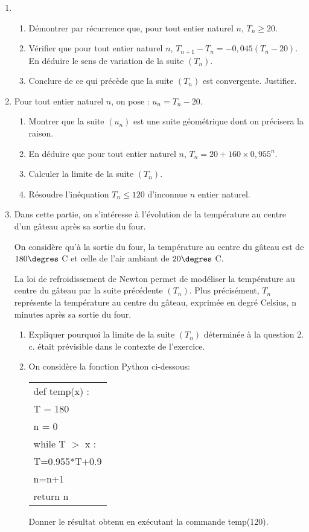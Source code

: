 \documentclass[10pt,a4paper]{article}
\begin{document}
\begin{enumerate}
\item 
	\begin{enumerate}
		\item Démontrer par récurrence que, pour tout entier naturel $n$,\: $T_n \geqslant 20$.
		\item Vérifier que pour tout entier naturel $n$,\: $T_{n+1} -  T_n  = - 0,045\left(T_n - 20\right)$. En déduire le sens de variation de la suite $\left(T_n\right)$.
		\item Conclure de ce qui précède que la suite $\left(T_n\right)$ est convergente. Justifier.
	\end{enumerate}	
\item Pour tout entier naturel $n$, on pose : $u_n =  T_n - 20$.
	\begin{enumerate}
		\item Montrer que la suite $\left(u_n\right)$ est une suite géométrique dont on précisera la raison.
		\item En déduire que pour tout entier naturel $n$, \:$T_n =  20 + 160 \times  0,955^n$.
		\item Calculer la limite de la suite $\left(T_n\right)$.
		\item Résoudre l'inéquation $T_n \leqslant 120$ d'inconnue $n$ entier naturel.
	\end{enumerate}	
\item Dans cette partie, on s'intéresse à l'évolution de la température au centre d'un gâteau après sa sortie du four. 

On considère qu'à la sortie du four, la température au centre du gâteau est de $180 \degres$ C et celle de l'air ambiant de $20 \degres$ C.

La loi de refroidissement de Newton permet de modéliser la température au centre du gâteau par la suite précédente $\left(T_n\right)$. Plus précisément, $T_n$ représente la température au centre du gâteau, exprimée en degré Celsius, n minutes après sa sortie du four.
	\begin{enumerate}
		\item Expliquer pourquoi la limite de la suite $\left(T_n\right)$ déterminée à la question 2. c. était prévisible dans le contexte de l'exercice.
		\item On considère la fonction Python ci-dessous:
		\begin{center}
		\begin{tabular}{|l|}\hline
def temp(x) :\\
\quad T = 180\\
\quad n = 0\\
\quad while T $>$ x :\\
\qquad T=0.955*T+0.9\\
\qquad n=n+1\\
\quad return n\\ \hline
\end{tabular}
\end{center}
Donner le résultat obtenu en exécutant la commande temp(120).


\end{enumerate}
\end{enumerate}
\end{document}
